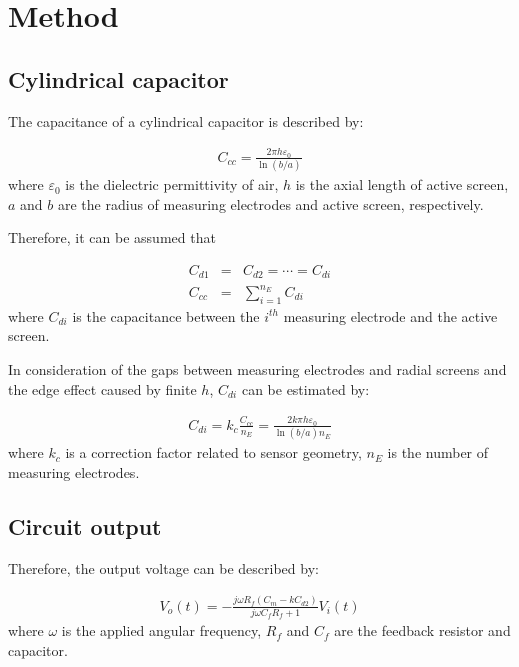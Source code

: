 \section{Method}


\subsection{Cylindrical capacitor}
The capacitance of a cylindrical capacitor is described by:

\begin{eqnarray}
C_{cc} = \frac{2\pi h \varepsilon_0}{\ln(b/a)}
\label{eq:cylindrical_capacitor}
\end{eqnarray}
where $\varepsilon_0$ is the dielectric permittivity of air, $h$ is the axial length of active screen, $a$ and $b$ are the radius of measuring electrodes and active screen, respectively.



Therefore, it can be assumed that

\begin{eqnarray}
C_{d1}&=&C_{d2}=\cdots=C_{di}\\
C_{cc}&=&\sum_{i=1}^{n_E} C_{di}
\label{eq:cd}
\end{eqnarray}
where $C_{di}$ is the capacitance between the $i^{th}$ measuring electrode  and the active screen.

In consideration of the gaps between measuring electrodes and radial screens and the edge effect caused by finite $h$, $C_{di}$  can be estimated by:

\begin{eqnarray}
C_{di} = k_c\frac{C_{cc}}{n_E}=\frac{2k\pi h \varepsilon_0}{\ln(b/a)n_E}
\label{eq:cna}
\end{eqnarray}
where $k_c$ is a correction factor related to sensor geometry, $n_E$ is the number of measuring electrodes.

\subsection{Circuit output}


Therefore, the output voltage can be described by:

\begin{eqnarray}
V_o(t) = -\frac{j\omega R_f(C_m - kC_{d2})}{j\omega C_f R_f +1}V_i(t)
\label{eq:voa}
\end{eqnarray}
where $\omega$ is the applied angular frequency, $R_f$ and $C_f$ are the feedback resistor and capacitor.

